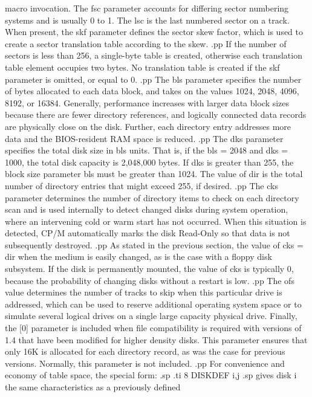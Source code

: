 macro invocation.  The fsc parameter accounts for differing 
sector numbering systems and is usually 0 to 1.  The lsc is the 
last numbered sector on a track.  When present, the skf parameter 
defines the sector skew factor, which is used to create a sector 
translation table according to the skew.
.pp
If the number of sectors is less than 256, a single-byte table is 
created, otherwise each translation table element occupies two 
bytes.  No translation table is created if the skf parameter is 
omitted, or equal to 0.
.pp
The bls parameter specifies the number of bytes allocated to each 
data block, and takes on the values 1024, 2048, 4096, 8192, or 
16384.  Generally, performance increases with larger data block 
sizes because there are fewer directory references, and logically 
connected data records are physically close on the disk.  
Further, each directory entry addresses more data and the BIOS-resident
RAM space is reduced.
.pp
The dks parameter specifies the total disk size in bls units.  
That is, if the bls = 2048 and dks = 1000, the total disk 
capacity is 2,048,000 bytes.  If dks is greater than 255, the 
block size parameter bls must be greater than 1024.  The value of 
dir is the total number of directory entries that might exceed 
255, if desired.
.pp
The cks parameter determines the number of directory items to 
check on each directory scan and is used internally to detect 
changed disks during system operation, where an intervening cold 
or warm start has not occurred.  When this situation is detected, 
CP/M automatically marks the disk Read-Only so that data is not 
subsequently destroyed.
.pp
As stated in the previous section, the value of cks = dir when 
the medium is easily changed, as is the case with a floppy disk 
subsystem.  If the disk is permanently mounted, the value of cks 
is typically 0, because the probability of changing disks without a 
restart is low.
.pp
The ofs value determines the number of tracks to skip when this 
particular drive is addressed, which can be used to reserve 
additional operating system space or to simulate several logical 
drives on a single large capacity physical drive.
Finally, the [0] parameter is included when file compatibility is 
required with versions of 1.4 that have been modified for higher 
density disks.  This parameter ensures that only 16K is allocated 
for each directory record, as was the case for previous versions.  
Normally, this parameter is not included.
.pp
For convenience and economy of table space, the special form:
.sp
.ti 8
DISKDEF      i,j
.sp
gives disk i the same characteristics as a previously defined 
